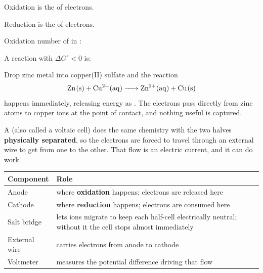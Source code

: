 \documentclass{apchem-notes}
\begin{document}

\begin{warmup}[4]
  \item Oxidation is the  of electrons.
  \item Reduction is the  of electrons.
  \item Oxidation number of  in :
  \item A reaction with $\Delta G^\circ < 0$ is:
\end{warmup}



Drop zinc metal into copper(II) sulfate and the reaction
\[ \ce{Zn(s) + Cu^2+(aq) -> Zn^2+(aq) + Cu(s)} \]
happens immediately, releasing energy as . The
electrons pass directly from zinc atoms to copper ions at the point of
contact, and nothing useful is captured.

A  (also called a voltaic cell) does the same chemistry
with the two halves \textbf{physically separated}, so the electrons are
forced to travel through an external wire to get from one to the other.
That flow is an electric current, and it can do work.


\begin{center}
\begin{tabular}{@{}>{\raggedright\arraybackslash}p{3.2cm}%
                 >{\raggedright\arraybackslash}p{9.6cm}@{}}
\hline
\textbf{Component} & \textbf{Role} \\
\hline
Anode & where \textbf{oxidation} happens; electrons are released here \\
Cathode & where \textbf{reduction} happens; electrons are consumed here \\
Salt bridge & lets ions migrate to keep each half-cell electrically
  neutral; without it the cell stops almost immediately \\
External wire & carries electrons from anode to cathode \\
Voltmeter & measures the potential difference driving that flow \\
\hline
\end{tabular}
\end{center}
\end{document}
